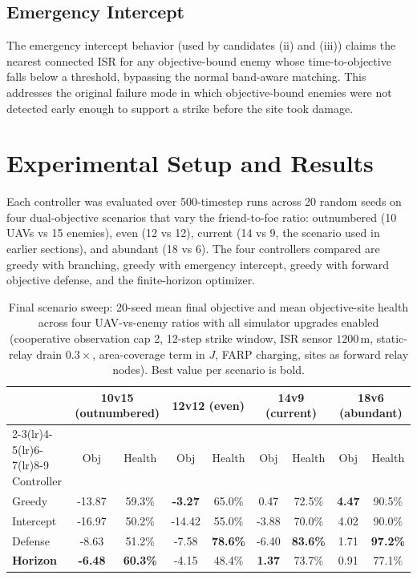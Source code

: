 \documentclass[conference]{IEEEtran}
\begin{document}
\subsection{Emergency Intercept}
The emergency intercept behavior (used by candidates (ii) and (iii)) claims
the nearest connected ISR for any objective-bound enemy whose time-to-objective
falls below a threshold, bypassing the normal band-aware matching. This
addresses the original failure mode in which objective-bound enemies were not
detected early enough to support a strike before the site took damage.

\section{Experimental Setup and Results}
Each controller was evaluated over 500-timestep runs across 20 random seeds
on four dual-objective scenarios that vary the friend-to-foe ratio:
outnumbered (10 UAVs vs 15 enemies), even (12 vs 12), current
(14 vs 9, the scenario used in earlier sections), and abundant (18 vs 6).
The four controllers compared are greedy with branching, greedy with
emergency intercept, greedy with forward objective defense, and the
finite-horizon optimizer.

\begin{table}[t]
\centering
\caption{Final scenario sweep: 20-seed mean final objective and mean
objective-site health across four UAV-vs-enemy ratios with all simulator
upgrades enabled (cooperative observation cap 2, 12-step strike window,
ISR sensor $1200$\,m, static-relay drain $0.3\times$, area-coverage term
in $J$, FARP charging, sites as forward relay nodes). Best value per
scenario is bold.}
\label{tab:results}
\begin{tabular}{lcccccccc}
\toprule
& \multicolumn{2}{c}{10v15 (outnumbered)} & \multicolumn{2}{c}{12v12 (even)}
& \multicolumn{2}{c}{14v9 (current)}     & \multicolumn{2}{c}{18v6 (abundant)} \\
\cmidrule(lr){2-3}\cmidrule(lr){4-5}\cmidrule(lr){6-7}\cmidrule(lr){8-9}
Controller & Obj & Health & Obj & Health & Obj & Health & Obj & Health \\
\midrule
Greedy       & -13.87 & 59.3\% & \textbf{-3.27} & 65.0\% &  0.47 & 72.5\% & \textbf{4.47} & 90.5\% \\
Intercept    & -16.97 & 50.2\% & -14.42 & 55.0\% & -3.88 & 70.0\% & 4.02 & 90.0\% \\
Defense      &  -8.63 & 51.2\% &  -7.58 & \textbf{78.6\%} & -6.40 & \textbf{83.6\%} & 1.71 & \textbf{97.2\%} \\
\textbf{Horizon} & \textbf{-6.48} & \textbf{60.3\%} & -4.15 & 48.4\% & \textbf{1.37} & 73.7\% & 0.91 & 77.1\% \\
\bottomrule
\end{tabular}
\end{table}
\end{document}
